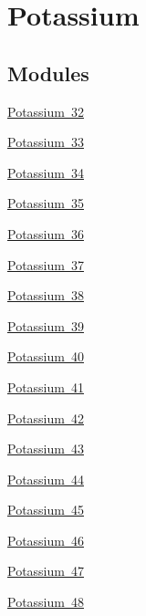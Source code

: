 \hypertarget{group___isotope_const-_potassium}{}\section{Potassium}
\label{group___isotope_const-_potassium}
\subsection*{Modules}
\begin{DoxyCompactItemize}
\item 
\mbox{\hyperlink{group___isotope_const-_potassium-_k32}{Potassium 32}}
\item 
\mbox{\hyperlink{group___isotope_const-_potassium-_k33}{Potassium 33}}
\item 
\mbox{\hyperlink{group___isotope_const-_potassium-_k34}{Potassium 34}}
\item 
\mbox{\hyperlink{group___isotope_const-_potassium-_k35}{Potassium 35}}
\item 
\mbox{\hyperlink{group___isotope_const-_potassium-_k36}{Potassium 36}}
\item 
\mbox{\hyperlink{group___isotope_const-_potassium-_k37}{Potassium 37}}
\item 
\mbox{\hyperlink{group___isotope_const-_potassium-_k38}{Potassium 38}}
\item 
\mbox{\hyperlink{group___isotope_const-_potassium-_k39}{Potassium 39}}
\item 
\mbox{\hyperlink{group___isotope_const-_potassium-_k40}{Potassium 40}}
\item 
\mbox{\hyperlink{group___isotope_const-_potassium-_k41}{Potassium 41}}
\item 
\mbox{\hyperlink{group___isotope_const-_potassium-_k42}{Potassium 42}}
\item 
\mbox{\hyperlink{group___isotope_const-_potassium-_k43}{Potassium 43}}
\item 
\mbox{\hyperlink{group___isotope_const-_potassium-_k44}{Potassium 44}}
\item 
\mbox{\hyperlink{group___isotope_const-_potassium-_k45}{Potassium 45}}
\item 
\mbox{\hyperlink{group___isotope_const-_potassium-_k46}{Potassium 46}}
\item 
\mbox{\hyperlink{group___isotope_const-_potassium-_k47}{Potassium 47}}
\item 
\mbox{\hyperlink{group___isotope_const-_potassium-_k48}{Potassium 48}}
\item 

\end{DoxyCompactItemize}
